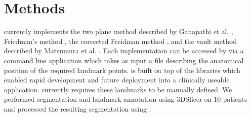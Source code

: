 \section{Methods}
\label{sec:methods}
\sksglenoid currently implements the two plane method described by Ganapathi et al. \cite{PMID:20933439}, Friedman's method \cite{PMID:1522089}, the 
corrected Freidman method \cite{BUDGE2011577}, and the vault method described by Matsumura et al. \cite{PMID:24618285}. Each implementation can be accessed by via a command line application which takes as 
input a file describing the anatomical position of the required landmark points. 
\sksglenoid is built on top of the \sksurgery \cite{PMID:32436132} libraries which enabled 
rapid development and future deployment into a clinically useable application.  
\sksglenoid currently requires these landmarks to be manually defined. We performed segmentation 
and landmark annotation using 3DSlicer \cite{Kikinis2014} on 10 patients and processed the resulting 
segmentation using \sksglenoid.

